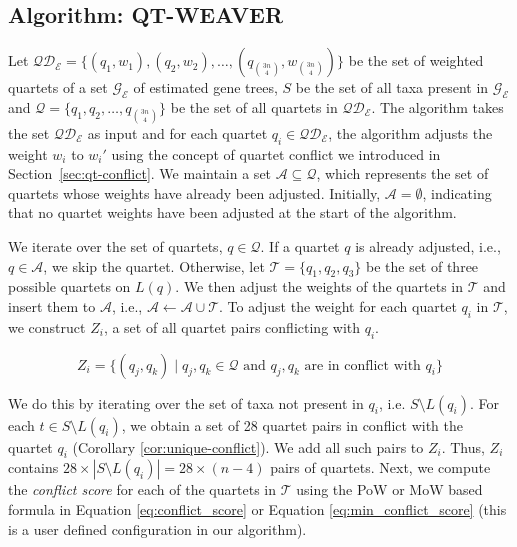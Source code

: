 \documentclass[10pt,a4paper]{article}
\newcommand{\addb}[1]{{\color{red} #1}}
\begin{document}
\subsection{Algorithm: QT-WEAVER}
\label{sec:qt-weaver-algorithm}

Let $\mathcal{QD_E} = \{ (q_1,w_1), (q_2,w_2), \ldots, (q_{3n \choose 4},w_{3n \choose 4}) \}$ be the set of weighted quartets of a set $\mathcal{G_E}$ of estimated gene trees, $S$ be the set of all taxa present in  $\mathcal{G_E}$ and $\mathcal{Q} = \{ q_1, q_2, \ldots,q_{3n \choose 4} \} $ be the set of all quartets in $\mathcal{QD_E}$. The algorithm takes the set $\mathcal{QD_E}$ as input and for each quartet $q_i \in \mathcal{QD_E}$, the algorithm adjusts the weight $w_i$ to $w_i'$ using the concept of quartet conflict we introduced in Section~\ref{sec:qt-conflict}. We maintain a set \( \mathcal{A} \subseteq \mathcal{Q} \), which represents the set of quartets whose weights have already been adjusted.  Initially, \( \mathcal{A} = \emptyset \), indicating that no quartet weights have been adjusted at the start of the algorithm.

We iterate over the set of quartets, $q \in \mathcal{Q}$. If a quartet $q$ is already adjusted, i.e., $ q \in \mathcal{A} $, we skip the quartet. Otherwise, let $ \mathcal{T} = \{q_1, q_2, q_3\}$ be the set of three possible quartets on $L(q)$. %
We then adjust the weights of the quartets in $\mathcal{T}$ and insert them to $\mathcal{A}$, i.e., $\mathcal{A} \leftarrow \mathcal{A} \cup \mathcal{T}$. To adjust the weight for each quartet $q_i$ in $\mathcal{T}$, we construct $Z_i$, a set of all quartet pairs conflicting with $q_i$. %

$$
Z_i = \{(q_j, q_k) \mid q_j, q_k \in \mathcal{Q} \text{ and } q_j, q_k \text{ are in conflict with } q_i\}
$$

We do this by iterating over the set of taxa not present in $q_i$, i.e. $S \setminus L(q_i)$. 
For each $t \in S \setminus L(q_i)$, we obtain a set of 28 quartet pairs in conflict with the quartet $q_i$ (Corollary \ref{cor:unique-conflict}). We add all such pairs to $Z_i$. Thus, $Z_i$ contains $28\times|S \setminus L(q_i)| = 28 \times (n-4)$ pairs of quartets. Next, we compute the \textit{conflict score} for each of the quartets in $\mathcal{T}$ using the PoW or MoW based formula in Equation \eqref{eq:conflict_score} or Equation \ref{eq:min_conflict_score} (this is a user defined configuration in our algorithm).
\end{document}
